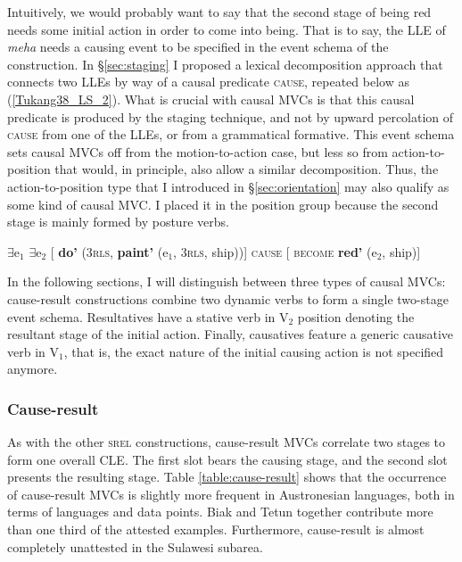 Intuitively, we would probably want to say that the second stage of being red needs some initial action in order to come into being. That is to say, the LLE of \textit{meha} needs a causing event to be specified in the event schema of the construction. In §\ref{sec:staging} I proposed a lexical decomposition approach that connects two LLEs by way of a causal predicate \textsc{cause}, repeated below as (\ref{Tukang38_LS_2}). What is crucial with causal MVCs is that this causal predicate is produced by the staging technique, and not by upward percolation of \textsc{cause} from one of the LLEs, or from a grammatical formative. This event schema sets causal MVCs off from the motion-to-action case, but less so from action-to-position that would, in principle, also allow a similar decomposition. Thus, the action-to-position type that I introduced in §\ref{sec:orientation} may also qualify as some kind of causal MVC. I placed it in the position group because the second stage is mainly formed by posture verbs.

\ea \label{Tukang38_LS_2} 
$\exists$e$_1$ $\exists$e$_2$ [ \textbf{do'} (3\textsc{rls}, \textbf{paint'} (e$_1$, 3\textsc{rls}, ship))] \textsc{cause} [ \textsc{become} \textbf{red'} (e$_2$, ship)]
\z

In the following sections, I will distinguish between three types of causal MVCs: cause-result constructions combine two dynamic verbs to form a single two-stage event schema. Resultatives have a stative verb in V$_2$ position denoting the resultant stage of the initial action. Finally, causatives feature a generic causative verb in V$_1$, that is, the exact nature of the initial causing action is not specified anymore.

\subsubsection{Cause-result} \label{sec:cause-result}

As with the other \textsc{srel} constructions, cause-result MVCs correlate two stages to form one overall CLE. The first slot bears the causing stage, and the second slot presents the resulting stage. Table \ref{table:cause-result} shows that the occurrence of cause-result MVCs is slightly more frequent in Austronesian languages, both in terms of languages and data points. Biak and Tetun together contribute more than one third of the attested examples. Furthermore, cause-result is almost completely unattested in the Sulawesi subarea. 


